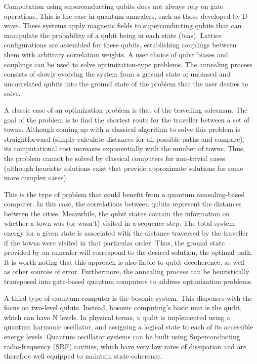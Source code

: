 Computation using superconducting qubits does not always rely on gate operations. This is the case in quantum annealers, such as those developed by D-wave. These systems apply magnetic fields to superconducting qubits that can manipulate the probability of a qubit being in each state (bias). Lattice configurations are assembled for these qubits, establishing couplings between them with arbitrary correlation weights. A user choice of qubit biases and couplings can be used to solve optimization-type problems. The annealing process consists of slowly evolving the system from a ground state of unbiased and uncorrelated qubits into the ground state of the problem that the user desires to solve.

A classic case of an optimization problem is that of the travelling salesman. The goal of the problem is to find the shortest route for the traveller between a set of towns. Although coming up with a classical algorithm to solve this problem is straightforward (simply calculate distances for all possible paths and compare), its computational cost increases exponentially with the number of towns. Thus, the problem cannot be solved by classical computers for non-trivial cases (although heuristic solutions exist that provide approximate solutions for some more complex cases).

This is the type of problem that could benefit from a quantum annealing-based computer. In this case, the correlations between qubits represent the distances between the cities. Meanwhile, the qubit states contain the information on whether a town was (or wasn't) visited in a sequence step. The total system energy for a given state is associated with the distance traversed by the traveller if the towns were visited in that particular order. Thus, the ground state provided by an annealer will correspond to the desired solution, the optimal path. It is worth noting that this approach is also liable to qubit decoherence, as well as other sources of error. Furthermore, the annealing process can be heuristically transposed into gate-based quantum computers to address optimization problems.

A third type of quantum computer is the bosonic system. This dispenses with the focus on two-level qubits. Instead, bosonic computing's basic unit is the qudit, which can have N levels. In physical terms, a qudit is implemented using a quantum harmonic oscillator, and assigning a logical state to each of its accessible energy levels. Quantum oscillator systems can be built using Superconducting radio-frequency (SRF) cavities, which have very low rates of dissipation and are therefore well equipped to maintain state coherence. 

